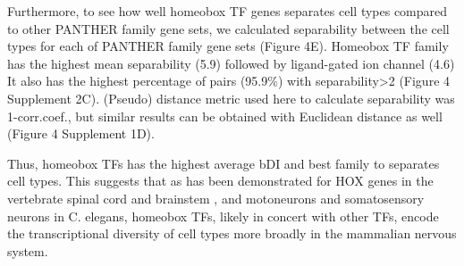 Furthermore, to see how well homeobox TF genes separates cell types compared to other PANTHER family gene sets, 
we calculated separability between the cell types for each of PANTHER family gene sets (Figure 4E). Homeobox TF family has the highest mean separability (5.9) followed by ligand-gated ion channel (4.6) It also has the highest percentage of pairs (95.9\%) with separability>2 (Figure 4 Supplement 2C). (Pseudo) distance metric used here to calculate separability was 1-corr.coef., but similar results can be obtained with Euclidean distance as well (Figure 4 Supplement 1D). 

Thus, homeobox TFs has the highest average bDI and best family to separates cell types. This suggests that as has been demonstrated for HOX genes in the vertebrate spinal cord and brainstem \cite{Dasen_2009,Philippidou_2013}, and motoneurons \cite{Kratsios_2017} and somatosensory neurons \cite{Zheng_2015} in C. elegans, homeobox TFs, likely in concert with other TFs, encode the transcriptional diversity of cell types more broadly in the mammalian nervous system.
